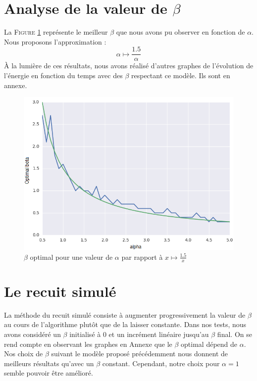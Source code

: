 \documentclass[twocolumn]{article}
\begin{document}
	\section{Analyse de la valeur de $\beta$}
		La \textsc{Figure} \ref{ex3} représente le meilleur $\beta$ que nous avons pu observer en fonction de $\alpha$. Nous proposons l'approximation : $$\alpha\mapsto\frac{1.5}{\alpha}$$
		À la lumière de ces résultats, nous avons réalisé d'autres graphes de l'évolution de l'énergie en fonction du temps avec des $\beta$ respectant ce modèle. Ils sont en annexe.
	\begin{figure}
		\includegraphics[width=\columnwidth]{../tobekept/exbonus1_2323132067031870085png-r.png}
		\caption{\label{ex3}$\beta$ optimal pour une valeur de $\alpha$ par rapport à $x\mapsto \frac{1.5}{x}$}
	\end{figure}
	\section{Le recuit simulé}
		La méthode du recuit simulé consiste à augmenter progressivement la valeur de $\beta$ au cours de l'algorithme plutôt que de la laisser constante. Dans nos tests, nous avons considéré un $\beta$ initialisé à 0 et un incrément linéaire jusqu'au $\beta$ final.
		On se rend compte en observant les graphes en Annexe que le $\beta$ optimal dépend de $\alpha$.  Nos choix de $\beta$ suivant le modèle proposé précédemment nous donnent de meilleurs résultats qu'avec un $\beta$ constant. Cependant, notre choix pour $\alpha = 1$ semble pouvoir être amélioré.
		
\end{document}

